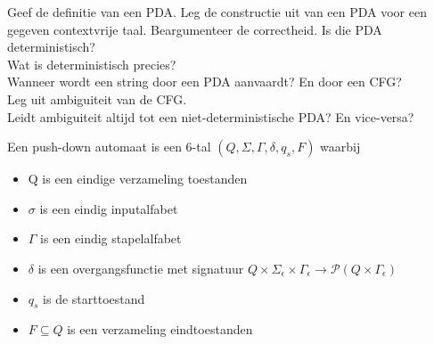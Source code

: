 \begin{question}
Geef de definitie van een PDA. Leg de constructie uit van een PDA voor een gegeven contextvrije taal. Beargumenteer de correctheid.
Is die PDA deterministisch?\\
Wat is deterministisch precies?\\
Wanneer wordt een string door een PDA aanvaardt? En door een CFG?\\
Leg uit ambiguiteit van de CFG.\\
Leidt ambiguiteit altijd tot een niet-deterministische PDA? En vice-versa?
\end{question}

\begin{theorem}
Een push-down automaat is een 6-tal $(Q,\Sigma, \Gamma, \delta, q_s, F)$ waarbij
\begin{itemize}
\item Q is een eindige verzameling toestanden
\item $\sigma$ is een eindig inputalfabet
\item $\Gamma$ is een eindig stapelalfabet
\item $\delta$ is een overgangsfunctie met signatuur $Q \times \Sigma_\epsilon \times \Gamma_\epsilon \rightarrow \mathcal{P}(Q \times \Gamma_\epsilon)$
\item $q_s$ is de starttoestand
\item $F \subseteq Q$ is een verzameling eindtoestanden
\end{itemize}
\end{theorem}